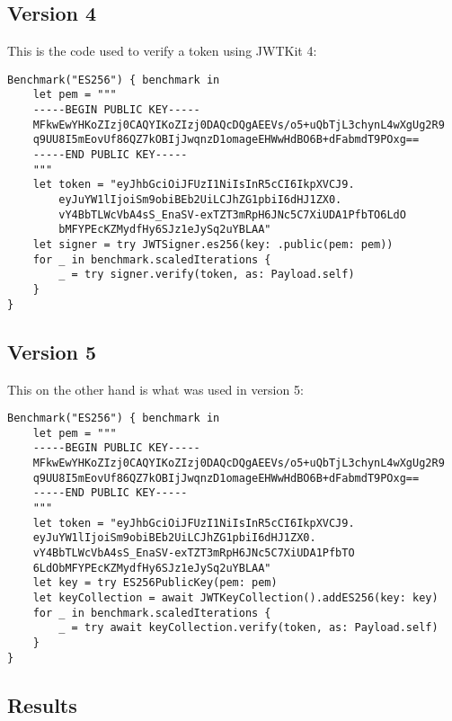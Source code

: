 \subsection*{Version 4}
This is the code used to verify a token using JWTKit 4:
\begin{verbatim}
Benchmark("ES256") { benchmark in
    let pem = """
    -----BEGIN PUBLIC KEY-----
    MFkwEwYHKoZIzj0CAQYIKoZIzj0DAQcDQgAEEVs/o5+uQbTjL3chynL4wXgUg2R9
    q9UU8I5mEovUf86QZ7kOBIjJwqnzD1omageEHWwHdBO6B+dFabmdT9POxg==
    -----END PUBLIC KEY-----
    """
    let token = "eyJhbGciOiJFUzI1NiIsInR5cCI6IkpXVCJ9.
        eyJuYW1lIjoiSm9obiBEb2UiLCJhZG1pbiI6dHJ1ZX0.
        vY4BbTLWcVbA4sS_EnaSV-exTZT3mRpH6JNc5C7XiUDA1PfbTO6LdO
        bMFYPEcKZMydfHy6SJz1eJySq2uYBLAA"
    let signer = try JWTSigner.es256(key: .public(pem: pem))
    for _ in benchmark.scaledIterations {
        _ = try signer.verify(token, as: Payload.self)
    }
}
\end{verbatim}

\subsection*{Version 5}
This on the other hand is what was used in version 5:
\begin{verbatim}
Benchmark("ES256") { benchmark in
    let pem = """
    -----BEGIN PUBLIC KEY-----
    MFkwEwYHKoZIzj0CAQYIKoZIzj0DAQcDQgAEEVs/o5+uQbTjL3chynL4wXgUg2R9
    q9UU8I5mEovUf86QZ7kOBIjJwqnzD1omageEHWwHdBO6B+dFabmdT9POxg==
    -----END PUBLIC KEY-----
    """
    let token = "eyJhbGciOiJFUzI1NiIsInR5cCI6IkpXVCJ9.
    eyJuYW1lIjoiSm9obiBEb2UiLCJhZG1pbiI6dHJ1ZX0.
    vY4BbTLWcVbA4sS_EnaSV-exTZT3mRpH6JNc5C7XiUDA1PfbTO
    6LdObMFYPEcKZMydfHy6SJz1eJySq2uYBLAA"
    let key = try ES256PublicKey(pem: pem)
    let keyCollection = await JWTKeyCollection().addES256(key: key)
    for _ in benchmark.scaledIterations {
        _ = try await keyCollection.verify(token, as: Payload.self)
    }
}
\end{verbatim}

\subsection*{Results}

